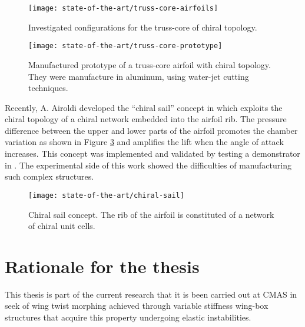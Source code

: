   \begin{figure}[!htpb]
    \centering
    \texttt{[image: state-of-the-art/truss-core-airfoils]}
    \caption[Investigated configurations for the truss-core of chiral topology]{Investigated configurations for the truss-core of chiral topology. \cite{Spadoni2007a}}\label{fig:truss-core-airfoil}
  \end{figure}

  \begin{figure}[!htpb]
    \centering
    \texttt{[image: state-of-the-art/truss-core-prototype]}
    \caption[Manufactured prototype of a truss-core airfoil with chiral topology]{Manufactured prototype of a truss-core airfoil with chiral topology. They were manufacture in aluminum, using water-jet cutting techniques. \cite{Spadoni2007b}}\label{fig:truss-core-prototype}
  \end{figure}

  Recently, A. Airoldi developed the ``chiral sail'' concept in \cite{Airoldi2012} which exploits the chiral topology of a chiral network embedded into the airfoil rib. The pressure difference between the upper and lower parts of the airfoil promotes the chamber variation as shown in Figure \ref{fig:chiral-sail} and amplifies the lift when the angle of attack increases. This concept was implemented and validated by testing a demonstrator in \cite{Airoldi2015a}. The experimental side of this work showed the difficulties of manufacturing such complex structures.

  \begin{figure}[!htpb]
    \centering
    \texttt{[image: state-of-the-art/chiral-sail]}
    \caption[Chiral sail concept]{Chiral sail concept. The rib of the airfoil is constituted of a network of chiral unit cells. \cite{Airoldi2012}}\label{fig:chiral-sail}
  \end{figure}  

\clearpage
\section{Rationale for the thesis} \label{sec:rationale_state}

  This thesis is part of the current research that it is been carried out at CMAS in seek of wing twist morphing achieved through variable stiffness wing-box structures that acquire this property undergoing elastic instabilities. 

